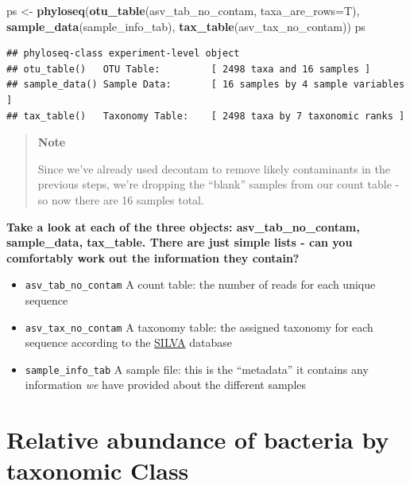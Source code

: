 \documentclass[
]{book}
\newenvironment{Shaded}{\begin{snugshade}}{\end{snugshade}}
\newcommand{\AttributeTok}[1]{\textcolor[rgb]{0.13,0.29,0.53}{#1}}
\newcommand{\FunctionTok}[1]{\textcolor[rgb]{0.13,0.29,0.53}{\textbf{#1}}}
\newcommand{\NormalTok}[1]{#1}
\newcommand{\OtherTok}[1]{\textcolor[rgb]{0.56,0.35,0.01}{#1}}
\begin{document}
\begin{Shaded}
\begin{Highlighting}[]
\NormalTok{ps }\OtherTok{\textless{}{-}} \FunctionTok{phyloseq}\NormalTok{(}\FunctionTok{otu\_table}\NormalTok{(asv\_tab\_no\_contam, }\AttributeTok{taxa\_are\_rows=}\NormalTok{T), }
               \FunctionTok{sample\_data}\NormalTok{(sample\_info\_tab), }
               \FunctionTok{tax\_table}\NormalTok{(asv\_tax\_no\_contam))}
\NormalTok{ps}
\end{Highlighting}
\end{Shaded}

\begin{verbatim}
## phyloseq-class experiment-level object
## otu_table()   OTU Table:         [ 2498 taxa and 16 samples ]
## sample_data() Sample Data:       [ 16 samples by 4 sample variables ]
## tax_table()   Taxonomy Table:    [ 2498 taxa by 7 taxonomic ranks ]
\end{verbatim}

\begin{quote}
\textbf{Note}

Since we've already used decontam to remove likely contaminants in the previous steps, we're dropping the ``blank'' samples from our count table - so now there are 16 samples total.
\end{quote}

\textbf{Take a look at each of the three objects: asv\_tab\_no\_contam, sample\_data, tax\_table. There are just simple lists - can you comfortably work out the information they contain?}

\begin{itemize}
\item
  \texttt{asv\_tab\_no\_contam} A count table: the number of reads for each unique sequence
\item
  \texttt{asv\_tax\_no\_contam} A taxonomy table: the assigned taxonomy for each sequence according to the \href{https://www.arb-silva.de/}{SILVA} database
\item
  \texttt{sample\_info\_tab} A sample file: this is the ``metadata'' it contains any information \emph{we} have provided about the different samples
\end{itemize}

\hypertarget{relative-abundance-of-bacteria-by-taxonomic-class}{%
\section{Relative abundance of bacteria by taxonomic Class}\label{relative-abundance-of-bacteria-by-taxonomic-class}}
\end{document}
